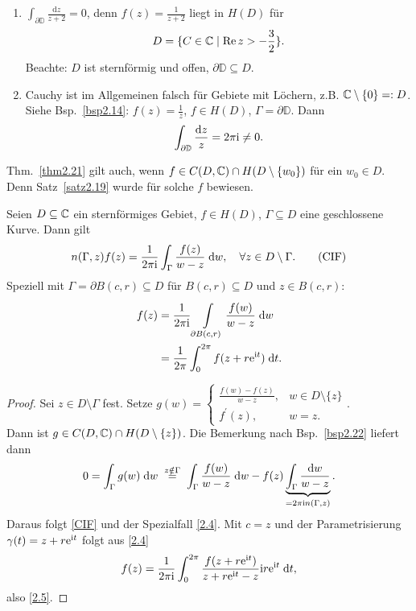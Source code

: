 \documentclass[a4paper,twoside,DIV15,BCOR12mm]{scrbook}
\begin{document}
\begin{bsp} \label{bsp2.22}
  \begin{enumerate}
  \item $\displaystyle\int_{\partial\mathbb{D}}{\frac{\mathrm{d}z}{z+2}}=0$, denn $f(z)=\frac{1}{z+2}$ liegt in $H(D)$ für
    \[D=\{C\in\mathbb{C} \mid \operatorname{Re}{z} > -\frac32\}.\] Beachte: $D$ ist sternförmig und offen, $\partial\mathbb{D}\subseteq D$.
  \item Cauchy ist im Allgemeinen falsch für Gebiete mit Löchern, z.B. $\mathbb{C}\setminus\{0\}=: D$. Siehe Bsp.~\ref{bsp2.14}:
    $f(z)=\frac1z$, $f\in H(D)$, $\Gamma=\partial\mathbb{D}$. Dann \[\int_{\partial\mathbb{D}}{\frac{\mathrm{d}z}{z}} = 2\pi\mathrm{i}
    \neq 0.\]
  \end{enumerate}
\end{bsp}

\begin{bem*}
  Thm.~\ref{thm2.21} gilt auch, wenn $f\in C(D,\mathbb{C}) \cap H(D\setminus\{w_0\})$ für ein $w_0\in D$. Denn Satz~\ref{satz2.19} wurde
  für solche $f$ bewiesen.
\end{bem*}

\begin{thm}
  Seien $D\subseteq\mathbb{C}$ ein sternförmiges Gebiet, $f\in H(D)$, $\Gamma\subseteq D$ eine geschlossene Kurve. Dann gilt
  \begin{equation} \label{CIF}
    n(\Gamma,z) f(z) = \frac{1}{2\pi\mathrm{i}} \int_{\Gamma}^{}{\frac{f(z)}{w-z}}\;\mathrm{d} w, \quad \forall z\in D\setminus\Gamma.
    \tag{CIF}
  \end{equation}
  Speziell mit $\Gamma=\partial B(c,r)\subseteq D$ für $B(c,r)\subseteq D$ und $z\in B(c,r)$:
  \begin{align}
    \label{2.4}
    f(z) &= \frac{1}{2\pi\mathrm{i}} \int\limits_{\partial B(c,r)}^{}{\frac{f(w)}{w-z}}\;\mathrm{d}w \\
    \label{2.5}
    &= \frac{1}{2\pi} \int_{0}^{2\pi}{f(z+r\mathrm{e}^{\mathrm{i} t})}\;\mathrm{d} t.
  \end{align}
\end{thm}
\begin{proof}
  Sei $z\in D\setminus\Gamma$ fest. Setze $\displaystyle g(w) = \begin{cases}
    \frac{f(w)-f(z)}{w-z}, &w\in D\setminus\{z\} \\
    f^\prime(z),            &w=z.
  \end{cases}$.\\
  Dann ist $g\in C(D,\mathbb{C})\cap H(D\setminus\{z\})$. Die Bemerkung nach Bsp.~\ref{bsp2.22} liefert dann
  \[ 0 = \integral{\Gamma}{}{g(w)}{w} \wegen{=}{z\notin\Gamma} \integral{\Gamma}{}{\frac{f(w)}{w-z}}{w} - f(z)
  \underbrace{\int_\Gamma{\frac{\mathrm{d}w}{w-z}}}_{=2\pi\i n(\Gamma,z)}. \]
  Daraus folgt \eqref{CIF} und der Spezialfall \eqref{2.4}. Mit $c=z$ und der Parametrisierung $\gamma(t)=z+r\mathrm{e}^{\mathrm{i} t}$ folgt
  aus \eqref{2.4}
  \[ f(z) = \frac{1}{2\pi\mathrm{i}} \int_{0}^{2\pi}{\frac{f(z+r \mathrm{e}^{\mathrm{i} t})}{z+r \mathrm{e}^{\mathrm{i} t} - z}\mathrm{i} r\mathrm{e}^{\mathrm{i} t}}\;\mathrm{d} t, \]
  also \eqref{2.5}.
\end{proof}
\end{document}
